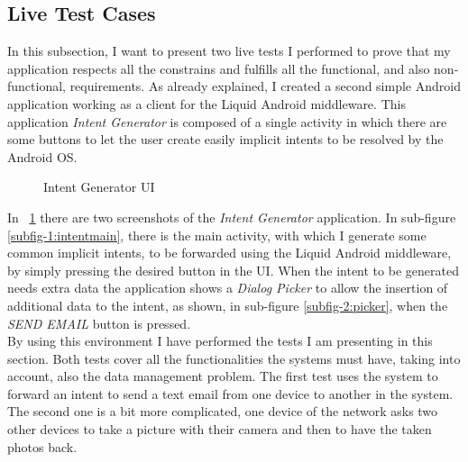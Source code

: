 \subsection{Live Test Cases}
In this subsection, I want to present two live tests I performed to prove that my application respects all the constrains and fulfills all the functional, and also non-functional, requirements.
As already explained, I created a second simple Android application working as a client for the Liquid Android middleware. This application \textit{Intent Generator} is composed of a single activity in which there are some buttons to let the user create easily implicit intents to be resolved by the Android OS.
\begin{figure}[h]
	\centering
	\begin{minipage}{.49\textwidth}\centering
	\end{minipage}
	\begin{minipage}{.49\textwidth}\centering
	\end{minipage}
	\caption{Intent Generator UI}
	\label{fig:5.5}
\end{figure}
In \figurename~\ref{fig:5.5} there are two screenshots of the \textit{Intent Generator} application. In sub-figure \ref{subfig-1:intentmain}, there is the main activity, with which I generate some common implicit intents, to be forwarded using the Liquid Android middleware, by simply pressing the desired button in the UI. When the intent to be generated needs extra data the application shows a \textit{Dialog Picker} to allow the insertion of additional data to the intent, as shown, in sub-figure \ref{subfig-2:picker}, when the \textit{SEND EMAIL} button is pressed.\\
By using this environment I have performed the tests I am presenting in this section. Both tests cover all the functionalities the systems must have, taking into account, also the data management problem. The first test uses the system to forward an intent to send a text email from one device to another in the system. The second one is a bit more complicated, one device of the network asks two other devices to take a picture with their camera and then to have the taken photos back.
